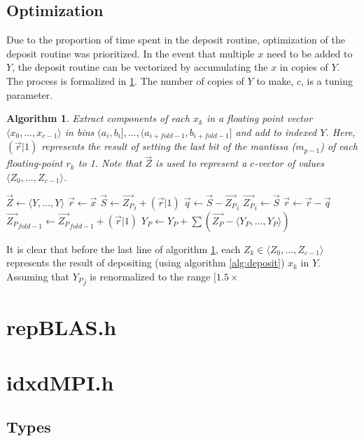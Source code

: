 \documentclass[12pt]{article}
\theoremstyle{plain}
\newtheorem{alg}{Algorithm}[section]
\begin{document}
  \subsection{Optimization}
    Due to the proportion of time spent in the deposit routine, optimization of the deposit routine was prioritized. In the event that multiple $x$ need to be added to $Y$, the deposit routine can be vectorized by accumulating the $x$ in copies of $Y$. The process is formalized in \ref{alg:depositvectorized}. The number of copies of $Y$ to make, $c$, is a tuning parameter.
      \begin{alg}
        Extract components of each $x_k$ in a floating point vector $\langle x_0, ..., x_{c - 1} \rangle$ in bins $(a_i, b_i], ..., (a_{i + fold - 1}, b_{i + fold - 1}]$ and add to indexed $Y$. Here, $(\vec{r} | 1)$ represents the result of setting the last bit of the mantissa ($m_{p - 1}$) of each floating-point $r_k$ to 1. Note that $\vec{Z}$ is used to represent a $c$-vector of values $\langle Z_0, ..., Z_{c - 1} \rangle$.
        \begin{algorithmic}
            \State $\vec{Z} \gets \langle Y, ..., Y \rangle$
            \State $\vec{r} \gets \vec{x}$
              \State $\vec{S} \gets {\vec{Z_P}}_i + (\vec{r} | 1)$
              \State $\vec{q} \gets \vec{S} - {\vec{Z_P}}_i$
              \State ${\vec{Z_P}}_i \gets \vec{S}$
              \State $\vec{r} \gets \vec{r} - \vec{q}$
            \EndFor
            \State ${\vec{Z_P}}_{fold - 1} \gets {\vec{Z_P}}_{fold - 1} + (\vec{r} | 1)$
            \State $Y_P \gets Y_P + \sum(\vec{Z_P} - \langle Y_P, ..., Y_P \rangle)$
          \EndFunction
        \end{algorithmic}
        \label{alg:depositvectorized}
      \end{alg}
      It is clear that before the last line of algorithm \ref{alg:depositvectorized}, each $Z_k \in \langle Z_0, ..., Z_{c - 1} \rangle$ represents the result of depositing (using algorithm \ref{alg:deposit}) $x_k$ in $Y$. Assuming that ${Y_P}_j$ is renormalized to the range $[1.5 \times $
\section{repBLAS.h}
\section{idxdMPI.h}
  \subsection{Types}
\end{document}
